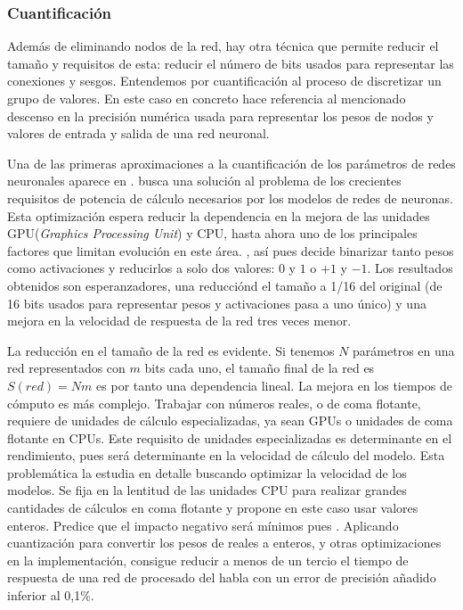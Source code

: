 \subsubsection{Cuantificación}

Además de eliminando nodos de la red, hay otra técnica que permite reducir el tamaño y requisitos de esta: reducir el número de bits usados para representar las conexiones y sesgos. Entendemos por cuantificación al proceso de discretizar un grupo de valores. En este caso en concreto hace referencia al mencionado descenso en la precisión numérica usada para representar los pesos de nodos y valores de entrada y salida de una red neuronal.

Una de las primeras aproximaciones a la cuantificación de los parámetros de redes neuronales aparece en . \citeauthor{Courbariaux2015} busca una solución al problema de los crecientes requisitos de potencia de cálculo necesarios por los modelos de redes de neuronas. Esta optimización espera reducir la dependencia en la mejora de las unidades GPU(\textit{Graphics Processing Unit}) y CPU, hasta ahora uno de los principales factores que limitan evolución en este área. , así pues decide binarizar tanto pesos como activaciones y reducirlos a solo dos valores: $0$ y $1$ o $+1$ y $-1$. Los resultados obtenidos son esperanzadores, una reducciónd el tamaño a 1/16 del original (de 16 bits usados para representar pesos y activaciones pasa a uno único) y una mejora en la velocidad de respuesta de la red tres veces menor.

La reducción en el tamaño de la red es evidente. Si tenemos $N$ parámetros en una red representados con $m$ bits cada uno, el tamaño final de la red es $S(red)=Nm$ es por tanto una dependencia lineal. La mejora en los tiempos de cómputo es más complejo. Trabajar con números reales, o de coma flotante, requiere de unidades de cálculo especializadas, ya sean GPUs o unidades de coma flotante en CPUs. Este requisito de unidades especializadas es determinante en el rendimiento, pues será determinante en la velocidad de cálculo del modelo. Esta problemática la estudia en detalle  buscando optimizar la velocidad de los modelos. Se fija en la lentitud de las unidades CPU para realizar grandes cantidades de cálculos en coma flotante y propone en este caso usar valores enteros. Predice que el impacto negativo será mínimos pues . Aplicando cuantización para convertir los pesos de reales a enteros, y otras optimizaciones en la implementación, consigue reducir a menos de un tercio el tiempo de respuesta de una red de procesado del habla con un error de precisión añadido inferior al 0,1\%.

